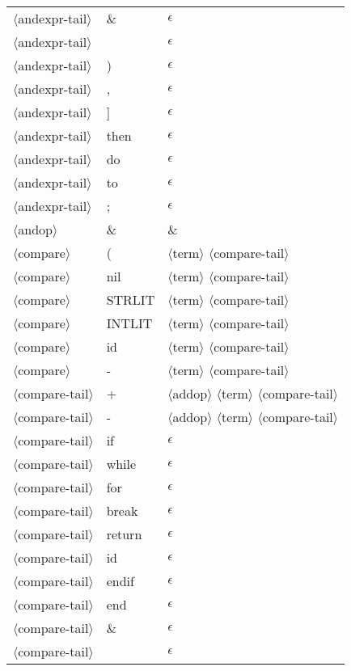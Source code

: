 \documentclass[11pt, fleqn]{article}
\newcommand{\atag}[1]{$\langle$#1$\rangle$}
\begin{document}
\begin{longtable}{l|l|l}
\atag{andexpr-tail}				&	\&			&	$\epsilon$	\\
\atag{andexpr-tail}				&	\textbar		&	$\epsilon$	\\
\atag{andexpr-tail}				&	)			&	$\epsilon$	\\
\atag{andexpr-tail}				&	,			&	$\epsilon$	\\
\atag{andexpr-tail}				&	]			&	$\epsilon$	\\
\atag{andexpr-tail}				&	then			&	$\epsilon$	\\
\atag{andexpr-tail}				&	do			&	$\epsilon$	\\
\atag{andexpr-tail}				&	to			&	$\epsilon$	\\
\atag{andexpr-tail}				&	;			&	$\epsilon$	\\
\atag{andop}						&	\&			&	\&										\\
\atag{compare} 					&	(			&	\atag{term} \atag{compare-tail}	\\
\atag{compare} 					&	nil			&	\atag{term} \atag{compare-tail}	\\
\atag{compare} 					&	STRLIT		&	\atag{term} \atag{compare-tail}	\\
\atag{compare} 					&	INTLIT		&	\atag{term} \atag{compare-tail}	\\
\atag{compare} 					&	id			&	\atag{term} \atag{compare-tail}	\\
\atag{compare} 					&	-			&	\atag{term} \atag{compare-tail}	\\
\atag{compare-tail}				&	+			&	\atag{addop} \atag{term} \atag{compare-tail}	\\
\atag{compare-tail}				&	-			&	\atag{addop} \atag{term} \atag{compare-tail}	\\
\atag{compare-tail}				&	if			&	$\epsilon$					\\
\atag{compare-tail}				&	while			&	$\epsilon$					\\
\atag{compare-tail}				&	for			&	$\epsilon$					\\
\atag{compare-tail}				&	break			&	$\epsilon$					\\
\atag{compare-tail}				&	return			&	$\epsilon$					\\
\atag{compare-tail}				&	id			&	$\epsilon$					\\
\atag{compare-tail}				&	endif			&	$\epsilon$					\\
\atag{compare-tail}				&	end			&	$\epsilon$					\\
\atag{compare-tail}				&	\&			&	$\epsilon$					\\
\atag{compare-tail}				&	\textbar			&	$\epsilon$					\\

\end{longtable}
\end{document}
